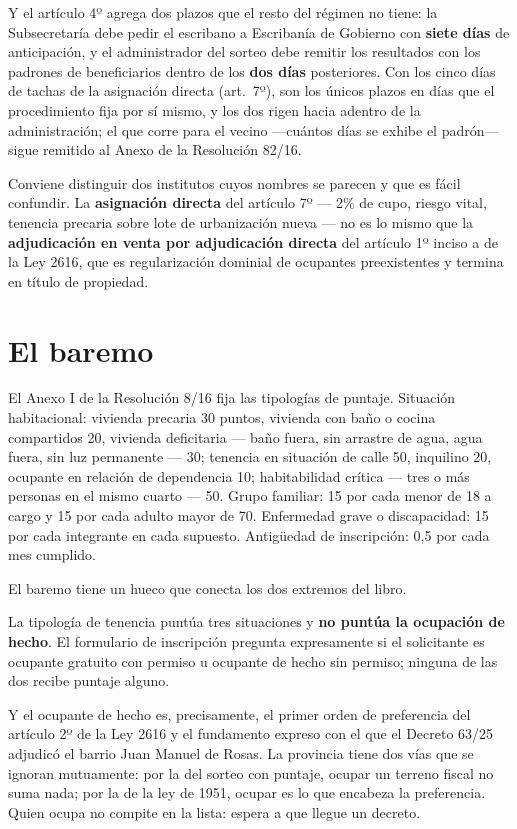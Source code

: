 Y el artículo 4º agrega dos plazos que el resto del régimen no tiene: la Subsecretaría debe pedir el escribano a Escribanía de Gobierno con \textbf{siete días} de anticipación, y el administrador del sorteo debe remitir los resultados con los padrones de beneficiarios dentro de los \textbf{dos días} posteriores. Con los cinco días de tachas de la asignación directa (art.\ 7º), son los únicos plazos en días que el procedimiento fija por sí mismo, y los dos rigen hacia adentro de la administración; el que corre para el vecino ---cuántos días se exhibe el padrón--- sigue remitido al Anexo de la Resolución 82/16.

Conviene distinguir dos institutos cuyos nombres se parecen y que es fácil confundir. La \textbf{asignación directa} del artículo 7º --- 2\% de cupo, riesgo vital, tenencia precaria sobre lote de urbanización nueva --- no es lo mismo que la \textbf{adjudicación en venta por adjudicación directa} del artículo 1º inciso a de la Ley 2616, que es regularización dominial de ocupantes preexistentes y termina en título de propiedad.

\section{El baremo}

El Anexo I de la Resolución 8/16 fija las tipologías de puntaje. Situación habitacional: vivienda precaria 30 puntos, vivienda con baño o cocina compartidos 20, vivienda deficitaria --- baño fuera, sin arrastre de agua, agua fuera, sin luz permanente --- 30; tenencia en situación de calle 50, inquilino 20, ocupante en relación de dependencia 10; habitabilidad crítica --- tres o más personas en el mismo cuarto --- 50. Grupo familiar: 15 por cada menor de 18 a cargo y 15 por cada adulto mayor de 70. Enfermedad grave o discapacidad: 15 por cada integrante en cada supuesto. Antigüedad de inscripción: 0,5 por cada mes cumplido.

El baremo tiene un hueco que conecta los dos extremos del libro.

La tipología de tenencia puntúa tres situaciones y \textbf{no puntúa la ocupación de hecho}. El formulario de inscripción pregunta expresamente si el solicitante es ocupante gratuito con permiso u ocupante de hecho sin permiso; ninguna de las dos recibe puntaje alguno.

Y el ocupante de hecho es, precisamente, el primer orden de preferencia del artículo 2º de la Ley 2616 y el fundamento expreso con el que el Decreto 63/25 adjudicó el barrio Juan Manuel de Rosas. La provincia tiene dos vías que se ignoran mutuamente: por la del sorteo con puntaje, ocupar un terreno fiscal no suma nada; por la de la ley de 1951, ocupar es lo que encabeza la preferencia. Quien ocupa no compite en la lista: espera a que llegue un decreto.

